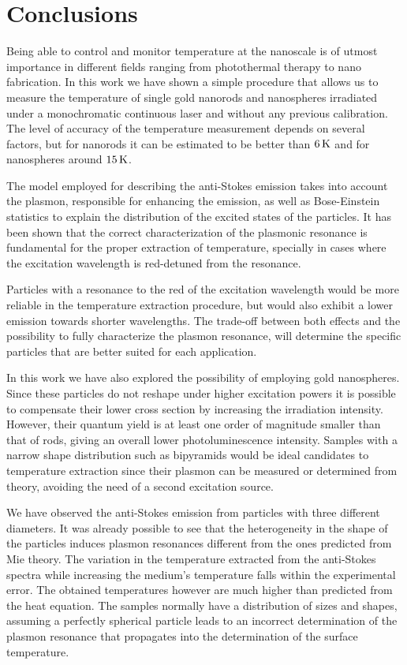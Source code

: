 \section{Conclusions}
Being able to control and monitor temperature at the nanoscale is of utmost
importance in different fields ranging from photothermal therapy\cite{Huang2006}
to nano fabrication\cite{Fedoruk2013}. In this work we have shown a simple
procedure that allows us to measure the temperature of single gold nanorods and
nanospheres irradiated under a monochromatic continuous laser and without any
previous calibration. The level of accuracy of the temperature measurement
depends on several factors, but for nanorods it can be estimated to be better
than $6\,\textrm{K}$ and for nanospheres around $15\,\textrm{K}$.

The model employed for describing the anti-Stokes emission takes into account
the plasmon, responsible for enhancing the emission, as well as Bose-Einstein
statistics to explain the distribution of the excited states of the particles.
It has been shown that the correct characterization of the plasmonic resonance is
fundamental for the proper extraction of temperature, specially in cases
where the excitation wavelength is red-detuned from the resonance.

Particles with a resonance to the red of the excitation wavelength would be more
reliable in the temperature extraction procedure, but would also exhibit a lower
emission towards shorter wavelengths. The trade-off between both effects and
the possibility to fully characterize the plasmon resonance, will determine the
specific particles that are better suited for each application.

In this work we have also explored the possibility of employing gold
nanospheres. Since these particles do not reshape under higher excitation powers
it is possible to compensate their lower cross section by increasing the
irradiation intensity. However, their quantum yield is at least one order of
magnitude smaller than that of rods, giving an overall lower photoluminescence
intensity. Samples with a narrow shape distribution such as
bipyramids\cite{Pelton2009}  would be ideal candidates to temperature extraction
since their plasmon can be measured or determined from theory, avoiding the need
of a second excitation source.

We have observed the anti-Stokes emission from particles with three different
diameters. It was already possible to see that the heterogeneity in the shape of
the particles induces plasmon resonances different from the ones predicted from
Mie theory. The variation in the temperature extracted from the anti-Stokes
spectra while increasing the medium's temperature falls within the experimental
error. The obtained temperatures however are much higher than predicted from the
heat equation. The samples normally have a distribution of sizes and shapes,
assuming a perfectly spherical particle leads to an incorrect determination of
the plasmon resonance that propagates into the determination of the surface
temperature. 

